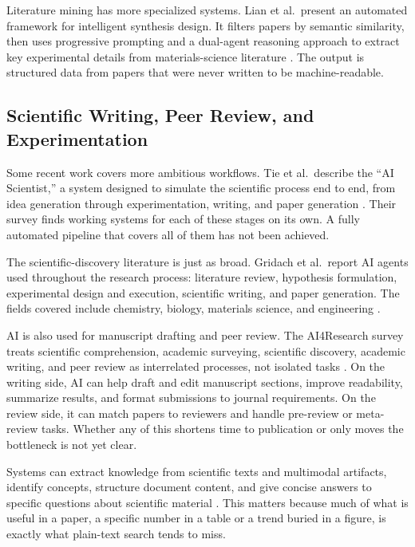 \documentclass[sn-basic,Numbered]{sn-jnl}
\begin{document}
Literature mining has more specialized systems. Lian et al.\ present an
automated framework for intelligent synthesis design. It filters papers
by semantic similarity, then uses progressive prompting and a
dual-agent reasoning approach to extract key experimental details from
materials-science literature \cite{lian2025literature}. The output is
structured data from papers that were never written to be
machine-readable.

\subsection{Scientific Writing, Peer Review, and Experimentation}

Some recent work covers more ambitious workflows. Tie et al.\ describe
the ``AI Scientist,'' a system designed to simulate the scientific
process end to end, from idea generation through experimentation,
writing, and paper generation \cite{tie2025aiscientists}. Their survey
finds working systems for each of these stages on its own. A fully
automated pipeline that covers all of them has not been achieved.

The scientific-discovery literature is just as broad. Gridach et al.\
report AI agents used throughout the research process: literature
review, hypothesis formulation, experimental design and execution,
scientific writing, and paper generation. The fields covered include
chemistry, biology, materials science, and engineering
\cite{gridach2025scientific}.

AI is also used for manuscript drafting and peer review. The AI4Research
survey treats scientific comprehension, academic surveying, scientific
discovery, academic writing, and peer review as interrelated processes,
not isolated tasks \cite{chen2025ai4research}. On the writing side, AI
can help draft and edit manuscript sections, improve readability,
summarize results, and format submissions to journal requirements. On
the review side, it can match papers to reviewers and handle pre-review
or meta-review tasks. Whether any of this shortens time to publication
or only moves the bottleneck is not yet clear.

Systems can extract knowledge from scientific texts and
multimodal artifacts, identify concepts, structure document content,
and give concise answers to specific questions about scientific
material \cite{chen2025ai4research}. This matters because much of what
is useful in a paper, a specific number in a table or a trend buried
in a figure, is exactly what plain-text search tends to miss.
\end{document}
